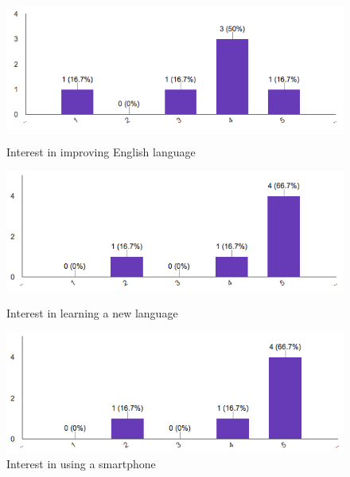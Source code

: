 \begin{figure}[!ht]
	\centering
	\begin{minipage}{.5\textwidth}
		\centering
		\includegraphics[scale=0.5]{Figures/responses/interest_improving_lang.png}
		\caption{Interest in improving English language}
		\label{fig:int_improving_lang}
	\end{minipage}%
	\begin{minipage}{.5\textwidth}
		\centering
		\includegraphics[scale=0.5]{Figures/responses/interest_learning_language.png}
		\caption{Interest in learning a new language}
		\label{fig:int_learnign_lang}
	\end{minipage}
    \begin{minipage}{.5\textwidth}
        \centering
        \includegraphics[scale=0.5]{Figures/responses/interest_usage_smartphone.png}
        \caption{Interest in using a smartphone}
        \label{fig:int_usage_smartphone}
    \end{minipage}%
\end{figure}
